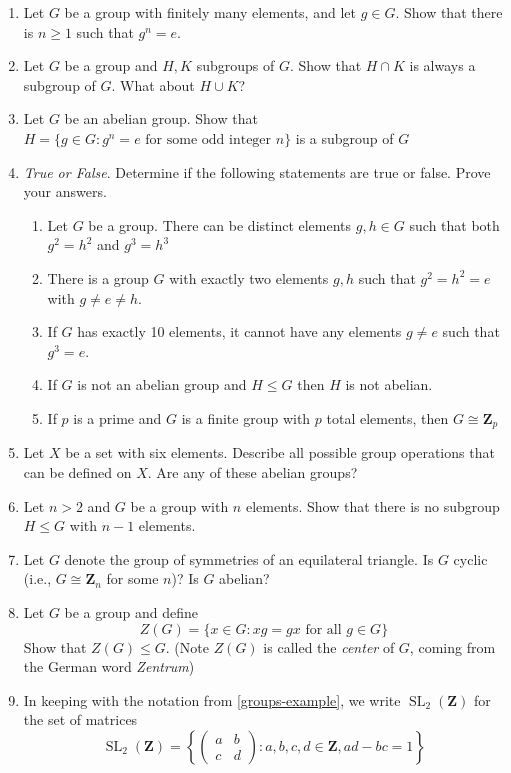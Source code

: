 \documentclass[12pt]{article}
\numberwithin{equation}{subsection}
\theoremstyle{note}
\newcommand{\SL}{\operatorname{SL}}
\begin{document}
\begin{enumerate}[label=\arabic*.]
	\item Let $G$ be a group with finitely many elements, and let $g\in G$. Show that there is $n\geq 1$ such that $g^n=e$. 
	\item Let $G$ be a group and $H,K$ subgroups of $G$. Show that $H\cap K$ is always a subgroup of $G$. What about $H\cup K$?

	\item Let $G$ be an abelian group. Show that $H=\{ g\in G: g^n=e \text{ for some odd integer $n$}\}$ is a subgroup of $G$
	
	\item \textit{True or False}. Determine if the following statements are true or false. Prove your answers. 
	\begin{enumerate}
		\item Let $G$ be a group. There can be distinct elements $g,h\in G$ such that both $g^2=h^2$ and $g^3=h^3$
		\item There is a group $G$ with exactly two elements $g,h$ such that $g^2=h^2=e$ with $g\neq e\neq h$.
		\item If $G$ has exactly 10 elements, it cannot have any elements $g\neq e$ such that $g^3=e$. 
		\item If $G$ is not an abelian group and $H\leq G$ then $H$ is not abelian. 
		\item If $p$ is a prime and $G$ is a finite group with $p$ total elements, then $G\cong \mathbf{Z}_p$
	\end{enumerate} 
	
	\item Let $X$ be a set with six elements. Describe all possible group operations that can be defined on $X$. Are any of these abelian groups?
	
	\item Let $n>2$ and $G$ be a group with $n$ elements. Show that there is no subgroup $H\leq G$ with $n-1$ elements. 

	\item Let $G$ denote the group of symmetries of an equilateral triangle. Is $G$ cyclic (i.e., $G\cong \mathbf{Z}_n$ for some $n$)? Is $G$ abelian? 
	
	\item Let $G$ be a group and define \begin{equation} Z(G)=\{ x\in G : xg=gx \text{ for all } g\in G\}\end{equation} Show that $Z(G)\leq G$. (Note $Z(G)$ is called the \textit{center} of $G$, coming from the German word \textit{Zentrum})
	\item In keeping with the notation from \ref{groups-example}, we write $\SL_2(\mathbf{Z})$ for the set of matrices \[ \SL_2(\mathbf{Z}) =\left\{ \begin{pmatrix} a & b \\ c & d \end{pmatrix} : a,b,c,d\in\mathbf{Z}, ad-bc=1\right\}\]
	

\end{enumerate}
\end{document}

